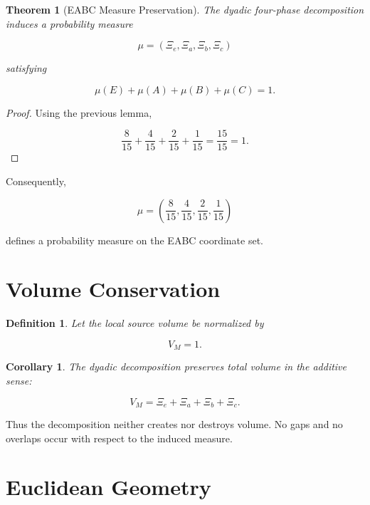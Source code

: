 \documentclass[11pt]{article}
\newtheorem{theorem}{Theorem}
\newtheorem{definition}{Definition}
\newtheorem{corollary}{Corollary}
\begin{document}
	\begin{theorem}[EABC Measure Preservation]
		
		The dyadic four-phase decomposition induces a probability measure
		
		\[
		\mu=(\Xi_e,\Xi_a,\Xi_b,\Xi_c)
		\]
		
		satisfying
		
		\[
		\mu(E)+\mu(A)+\mu(B)+\mu(C)=1.
		\]
		
	\end{theorem}
	
	\begin{proof}
		
		Using the previous lemma,
		
		\[
		\frac8{15}
		+
		\frac4{15}
		+
		\frac2{15}
		+
		\frac1{15}
		=
		\frac{15}{15}
		=
		1.
		\]
		
	\end{proof}
	
	Consequently,
	
	\[
	\mu
	=
	\left(
	\frac8{15},
	\frac4{15},
	\frac2{15},
	\frac1{15}
	\right)
	\]
	
	defines a probability measure on the EABC coordinate set.
	
	\section{Volume Conservation}
	
	\begin{definition}
		
		Let the local source volume be normalized by
		
		\[
		V_M=1.
		\]
		
	\end{definition}
	
	\begin{corollary}
		
		The dyadic decomposition preserves total volume in the additive sense:
		
		\[
		V_M
		=
		\Xi_e+\Xi_a+\Xi_b+\Xi_c.
		\]
		
	\end{corollary}
	
	Thus the decomposition neither creates nor destroys volume.
	No gaps and no overlaps occur with respect to the induced measure.
	
	\section{Euclidean Geometry}
	
\end{document}
